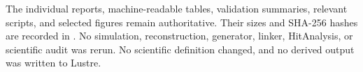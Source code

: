 \documentclass[11pt,a4paper]{article}
\begin{document}
\begin{center}
\end{center}

The individual reports, machine-readable tables, validation summaries, relevant scripts, and selected figures remain authoritative. Their sizes and SHA-256 hashes are recorded in . No simulation, reconstruction, generator, linker, HitAnalysis, or scientific audit was rerun. No scientific definition changed, and no derived output was written to Lustre.
\end{document}
